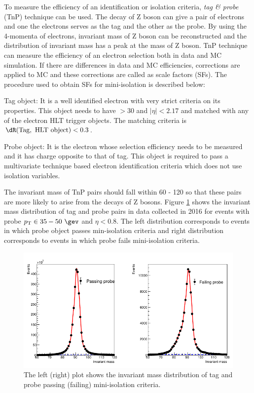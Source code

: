 To measure the efficiency of an identification or isolation criteria, \textit{tag \& probe} (TnP) technique can be used. 
The decay of Z boson can give a pair of electrons and one the electrons serves as the tag and the other as the probe. By using the 
4-momenta of electrons, invariant mass of Z boson can be reconstructed and the distribution of invariant mass has a peak at the mass of Z boson.
TnP technique can measure the efficiency of an electron selection both in data and MC simulation. If there are differences in data and
MC efficiencies, corrections are applied to MC and these corrections are called as scale factors (SFs). The procedure used to obtain SFs 
for mini-isolation is described below:

Tag object: It is a well identified electron with very strict criteria on its properties. This object needs to have \pt 
$>30$ \gev and $|\eta|<2.17$ and matched with any of the electron HLT trigger objects. The matching criteria is $\dR(\mathrm{Tag,\ HLT\ 
object})<0.3$.

Probe object: It is the electron whose selection efficiency needs to be measured and it has charge opposite to that of tag. This object is
required to pass a multivariate technique based electron identification criteria which does not use isolation variables.

The invariant mass of TnP pairs should fall within 60 - 120 \gev so that these pairs are more likely to arise from the decays 
of Z bosons. Figure \ref{fig:bin25_el_sc_eta_0p00To0p80_el_pt_35p00To50p00} shows the invariant mass distribution of tag and probe pairs 
in data collected in 2016 for events with probe $\pt \in 35 - 50\ \gev$ and $\eta < 0.8$. The left distribution corresponds to events in 
which probe object passes min-isolation criteria and right distribution corresponds to events in which probe fails mini-isolation criteria. 
\begin{figure}[h!]
\centering
\includegraphics[width=0.9\linewidth]{../Figures/Chap2/bin25_el_sc_eta_0p00To0p80_el_pt_35p00To50p00.pdf}
\captionsetup{width=.9\linewidth}
\caption[TnP fit for MiniIso pass/fail]{The left (right) plot shows the invariant mass distribution of tag and probe passing (failing) 
mini-isolation criteria.}
\label{fig:bin25_el_sc_eta_0p00To0p80_el_pt_35p00To50p00}
\end{figure}

